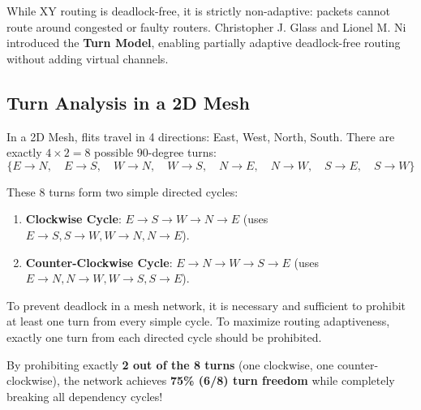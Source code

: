 While XY routing is deadlock-free, it is strictly non-adaptive: packets cannot route around congested or faulty routers. Christopher J. Glass and Lionel M. Ni~\cite{Glass1994} introduced the \textbf{Turn Model}, enabling partially adaptive deadlock-free routing without adding virtual channels.

\subsection{Turn Analysis in a 2D Mesh}
In a 2D Mesh, flits travel in 4 directions: East, West, North, South. There are exactly $4 \times 2 = 8$ possible 90-degree turns:
$$\{E \to N, \quad E \to S, \quad W \to N, \quad W \to S, \quad N \to E, \quad N \to W, \quad S \to E, \quad S \to W\}$$

These 8 turns form two simple directed cycles:
\begin{enumerate}
    \item \textbf{Clockwise Cycle}: $E \to S \to W \to N \to E$ (uses $E \to S, S \to W, W \to N, N \to E$).
    \item \textbf{Counter-Clockwise Cycle}: $E \to N \to W \to S \to E$ (uses $E \to N, N \to W, W \to S, S \to E$).
\end{enumerate}

\begin{theorem}[Glass \& Ni, 1994]
To prevent deadlock in a mesh network, it is necessary and sufficient to prohibit at least one turn from every simple cycle. To maximize routing adaptiveness, exactly one turn from each directed cycle should be prohibited.
\end{theorem}

By prohibiting exactly \textbf{2 out of the 8 turns} (one clockwise, one counter-clockwise), the network achieves \textbf{75\% (6/8) turn freedom} while completely breaking all dependency cycles!

